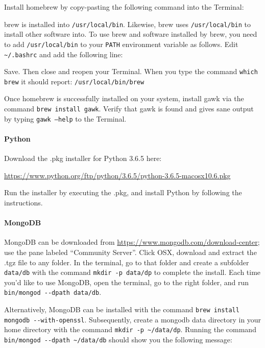 \documentclass[a4paper]{report}
\begin{document}
Install homebrew by copy-pasting the following command into the
Terminal:


brew is installed into {\small\texttt{/usr/local/bin}}. Likewise,
brew uses {\small\texttt{/usr/local/bin}} to install other software
into. To use brew and software installed by brew, you need to add
{\small\texttt{/usr/local/bin}} to your {\small\texttt{PATH}} environment
variable as follows. Edit {\small\texttt{\textasciitilde/.bashrc}}
and add the following line:


Save. Then close and reopen your Terminal. When you type
the command {\small\texttt{which brew}} it should report:
{\small\texttt{/usr/local/bin/brew}}

Once homebrew is successfully installed on your system, install gawk via the
command {\small\texttt{brew install gawk}}. Verify that gawk is found and
gives sane output by typing {\small\texttt{gawk --help}} to the Terminal.

\paragraph{Python}
Download the .pkg installer for Python 3.6.5 here:

\url{https://www.python.org/ftp/python/3.6.5/python-3.6.5-macosx10.6.pkg}

Run the installer by executing the .pkg, and install Python by following
the instructions.

\paragraph{MongoDB}
MongoDB can be downloaded from
\url{https://www.mongodb.com/download-center}; use the pane labeled
``Community Server''. Click OSX, download and
extract the .tgz file to any folder. In the terminal, go to that folder
and create a subfolder {\small\texttt{data/db}} with the command {\small\texttt{mkdir
-p data/dp}} to complete the install. Each time you{\textquoteright}d
like to use MongoDB, open the terminal, go to the right folder, and run
{\small\texttt{bin/mongod -{}-dpath data/db}}.

Alternatively, MongoDB can be installed with the command {\small\texttt{brew
install mongodb -{}-with-openssl}}. Subsequently, create a mongodb data
directory in your home directory with the command {\small\texttt{mkdir -p
\~{}/data/dp}}. Running the command {\small\texttt{bin/mongod -{}-dpath
\~{}/data/db}} should show you the following message:
\end{document}
